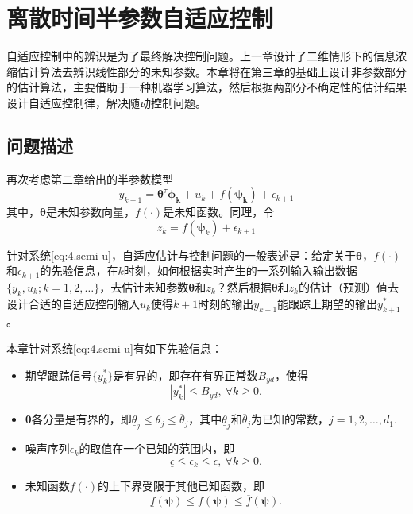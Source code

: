 \chapter{离散时间半参数自适应控制}\label{chap:4}
自适应控制中的辨识是为了最终解决控制问题。上一章设计了二维情形下的信息浓缩估计算法去辨识线性部分的未知参数。本章将在第三章的基础上设计非参数部分的估计算法，主要借助于一种机器学习算法，然后根据两部分不确定性的估计结果设计自适应控制律，解决随动控制问题。

\section{问题描述}\label{sect:4.1}
再次考虑第二章给出的半参数模型
\begin{equation}%
\label{eq:4.semi-u}
y_{k+1} = \bm{\theta}^{\tau}\bm{\phi_{k}}+u_{k}+f(\bm{\bm{\psi}_{k}})+\epsilon_{k+1}
\end{equation}
其中，$\bm{\theta}$是未知参数向量，$f(\cdot)$是未知函数。同理，令
\begin{equation}
z_{k} = f(\bm{\psi}_{k}) + \epsilon_{k+1}
\end{equation}

针对系统\eqref{eq:4.semi-u}，自适应估计与控制问题的一般表述是：给定关于$\bm{\theta}$，$f(\cdot)$和$\epsilon_{k+1}$的先验信息，在$k$时刻，如何根据实时产生的一系列输入输出数据$\{y_{k},u_{k};k=1,2,\ldots\}$，去估计未知参数$\bm{\theta}$和$z_{k}$？然后根据$\bm{\theta}$和$z_{k}$的估计（预测）值去设计合适的自适应控制输入$u_{k}$使得$k+1$时刻的输出$y_{k+1}$能跟踪上期望的输出$y_{k+1}^{*}$。

本章针对系统\eqref{eq:4.semi-u}有如下先验信息：
\begin{itemize}
\item 期望跟踪信号$\{y_{k}^{*}\}$是有界的，即存在有界正常数$B_{yd}$，使得
\begin{equation}\label{eq:4.ydB}
|y_{k}^{*}|\leq B_{yd},\ \forall k\geq0.
\end{equation}
\item $\bm{\theta}$各分量是有界的，即$\underline{\theta}_{j}\leq\theta_{j}\leq\overline{\theta}_{j}$，其中$\underline{\theta}_{j}$和$\overline{\theta}_{j}$为已知的常数，$j=1,2,\ldots,d_{1}$.
\item 噪声序列$\epsilon_{k}$的取值在一个已知的范围内，即
\begin{equation}\label{eq:4.wB}
\underline{\epsilon}\leq\epsilon_{k}\leq\overline{\epsilon},\ \forall k\geq0.
\end{equation}
\item 未知函数$f(\cdot)$的上下界受限于其他已知函数，即
\begin{equation}\label{eq:4.fB}
\underline{f}(\bm{\psi})\leq f(\bm{\psi})\leq \overline{f}(\bm{\psi}).
\end{equation}
\end{itemize}

